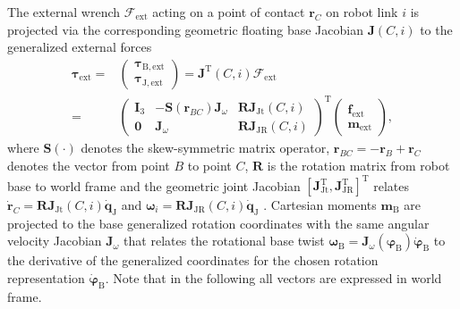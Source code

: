 The external wrench $\bm{\mathcal{F}}_{\mathrm{ext}}$ acting on a point of contact $\bm{r}_{C}$ on robot link $i$ is projected via the corresponding geometric floating base Jacobian $\bm{J}(C,i)$ to the generalized external forces
\begin{align}
\bm{\tau}_{\mathrm{ext}}=&
\begin{pmatrix} \bm{\tau}_{\mathrm{B,ext}}
\\
\bm{\tau}_{\mathrm{J,ext}}
\end{pmatrix}
=
\bm{J}^\mathrm{T}(C,i)
\bm{\mathcal{F}}_{\mathrm{ext}} \\
=&
\begin{pmatrix}
\bm{I}_3 & - \bm{S}(\bm{r}_{BC}) \bm{J}_\omega & \bm{R} \bm{J}_{\mathrm{Jt}}(C,i)\\
\bm{0} & \bm{J}_\omega &  \bm{R} \bm{J}_{\mathrm{JR}}(C,i)
\end{pmatrix}
^\mathrm{T}
\begin{pmatrix} \bm{f}_{\mathrm{ext}}
\\
\bm{m}_{\mathrm{ext}} \nonumber
\end{pmatrix},
\end{align}
where 
$\bm{S}(\cdot)$ denotes the skew-symmetric matrix operator,
$\bm{r}_{BC}=-\bm{r}_{B}+\bm{r}_{C}$ denotes the vector from point $B$ to point $C$,
$\bm{R}$ is the rotation matrix from robot base to world frame
and the geometric joint Jacobian $[\bm{J}_{\mathrm{Jt}}^\mathrm{T},\bm{J}_{\mathrm{JR}}^\mathrm{T}]^\mathrm{T}$ relates 
%
$\dot{\bm{r}}_{C}=\bm{R}\bm{J}_{\mathrm{Jt}}(C,i)\dot{\bm{q}}_\mathrm{J}$
and 
%
$\bm{\omega}_i=\bm{R}\bm{J}_{\mathrm{JR}}(C,i)\dot{\bm{q}}_\mathrm{J}$
%
\cite{OttHenLee2013,BouyarmaneKhe2012}.
Cartesian moments $\bm{m}_\mathrm{B}$ are projected to the base generalized rotation coordinates with the same angular velocity Jacobian $\bm{J}_\omega$ that relates the rotational base twist $\bm{\omega}_\mathrm{B}=\bm{J}_\omega(\bm{\varphi}_\mathrm{B})\dot{\bm{\varphi}}_\mathrm{B}$ to the derivative of the generalized coordinates for the chosen rotation representation $\dot{\bm{\varphi}}_\mathrm{B}$.
Note that in the following all vectors are expressed in world frame.
%
